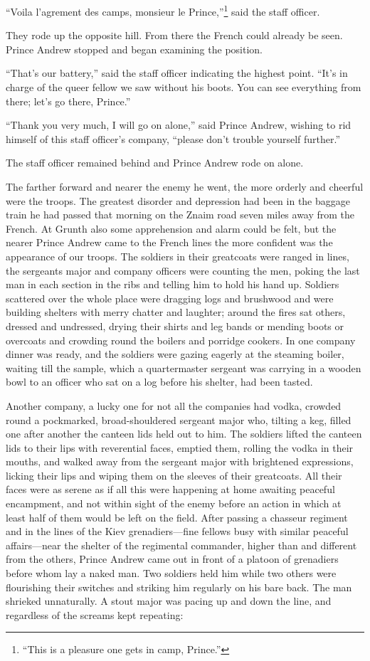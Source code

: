 ``Voila l'agrement des camps, monsieur le
Prince,''\footnote{``This is a pleasure one gets in camp,
Prince.''} said the staff officer.

They rode up the opposite hill. From there the French could
already be seen. Prince Andrew stopped and began examining the
position.

``That's our battery,'' said the staff officer indicating the
highest point. ``It's in charge of the queer fellow we saw
without his boots. You can see everything from there; let's go
there, Prince.''

``Thank you very much, I will go on alone,'' said Prince Andrew,
wishing to rid himself of this staff officer's company, ``please
don't trouble yourself further.''

The staff officer remained behind and Prince Andrew rode on
alone.

The farther forward and nearer the enemy he went, the more
orderly and cheerful were the troops. The greatest disorder and
depression had been in the baggage train he had passed that
morning on the Znaim road seven miles away from the French. At
Grunth also some apprehension and alarm could be felt, but the
nearer Prince Andrew came to the French lines the more confident
was the appearance of our troops. The soldiers in their
greatcoats were ranged in lines, the sergeants major and company
officers were counting the men, poking the last man in each
section in the ribs and telling him to hold his hand up. Soldiers
scattered over the whole place were dragging logs and brushwood
and were building shelters with merry chatter and laughter;
around the fires sat others, dressed and undressed, drying their
shirts and leg bands or mending boots or overcoats and crowding
round the boilers and porridge cookers.  In one company dinner
was ready, and the soldiers were gazing eagerly at the steaming
boiler, waiting till the sample, which a quartermaster sergeant
was carrying in a wooden bowl to an officer who sat on a log
before his shelter, had been tasted.

Another company, a lucky one for not all the companies had vodka,
crowded round a pockmarked, broad-shouldered sergeant major who,
tilting a keg, filled one after another the canteen lids held out
to him. The soldiers lifted the canteen lids to their lips with
reverential faces, emptied them, rolling the vodka in their
mouths, and walked away from the sergeant major with brightened
expressions, licking their lips and wiping them on the sleeves of
their greatcoats. All their faces were as serene as if all this
were happening at home awaiting peaceful encampment, and not
within sight of the enemy before an action in which at least half
of them would be left on the field. After passing a chasseur
regiment and in the lines of the Kiev grenadiers---fine fellows
busy with similar peaceful affairs---near the shelter of the
regimental commander, higher than and different from the others,
Prince Andrew came out in front of a platoon of grenadiers before
whom lay a naked man. Two soldiers held him while two others were
flourishing their switches and striking him regularly on his bare
back. The man shrieked unnaturally. A stout major was pacing up
and down the line, and regardless of the screams kept repeating:

